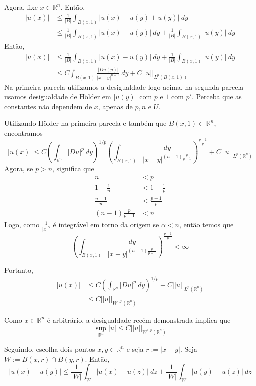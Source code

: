 \documentclass[a4paper, 11pt]{book}
\newcommand{\Rn}{{\mathbb{R}^n}}
\newcommand{\rn}{{\mathbb{R}^n}}
\begin{document}
Agora, fixe $x \in \Rn$. Então, \begin{align*}
	|u(x)| &  \leq \frac{1}{|B|}\int_{B(x,1)}|u(x) - u(y) + u(y)| \ dy \\
	  &\leq \frac{1}{|B|}\int_{B(x,1)} |u(x) - u(y)| \ dy + \frac{1}{|B|}\int_{B(x,1)}| u(y) |\ dy 
\end{align*}
Então, \begin{align*}
	|u(x)| &\leq \frac{1}{|B|}\int_{B(x,1)} |u(x) - u(y)| \ dy + \frac{1}{|B|}\int_{B(x,1)}| u(y) |\ dy \\
	&\leq C\int_{B(x,1)} \frac{|Du(y)|}{|x-y|^{n-1}}\ dy + C ||u||_{L^p(B(x,1))}
\end{align*}
Na primeira parcela utilizamos a desigualdade logo acima, na segunda parcela usamos desigualdade de Hölder em $|u(y)|$ com $p$ e $1$ com $p'$. Perceba que as constantes não dependem de $x$, apenas de $p, n$ e $U$.

Utilizando Hölder na primeira parcela e também que $B(x,1) \subset \Rn$, encontramos \[ |u(x)| \leq C \left(\int_\Rn |Du|^p \ dy \right)^{1/p}      \left(  \int_{B(x,1)} \frac{dy}{|x-y|^{(n-1)\frac{p}{p-1}}}  \right)^{\frac{p-1}{p}}      + C ||u||_{L^p(\Rn)} \] Agora, se $p>n$, significa que \begin{align*}	n &< p \\
	1 - \tfrac{1}{n} &< 1 - \tfrac{1}{p} \\
	\frac{n-1}{n} &< \frac{p-1}{p}	\\
	(n-1)\frac{p}{p-1} &< n
\end{align*} Logo, como $ \frac{1}{|x|^\alpha} $ é integrável em torno da origem se $\alpha<n$, então temos que \[ \left(  \int_{B(x,1)} \frac{dy}{|x-y|^{(n-1)\frac{p}{p-1}}}  \right)^{\frac{p-1}{p}}< \infty \]

Portanto, \begin{align*}
	|u(x)| &\leq C \left(\int_\Rn |Du|^p \ dy \right)^{1/p}          + C ||u||_{L^p(\Rn)} \\
	&\leq C ||u||_{W^{1,p}(\Rn)}
\end{align*}

Como $x \in \rn$ é arbitrário, a desigualdade recém demonstrada implica que \[ \sup_{\rn} |u| \leq C ||u||_{W^{1,p}(\rn)} \]



Seguindo, escolha dois pontos $x,y \in \rn$ e seja $r:= |x-y|$. Seja $W:= B(x,r) \cap B(y,r)$. Então, \[ |u(x) - u(y)| \leq \frac{1}{|W|}\int_W |u(x) -u(z)|\ dz + \frac{1}{|W|} \int_W |u(y) - u(z)| \ dz\]
\end{document}
